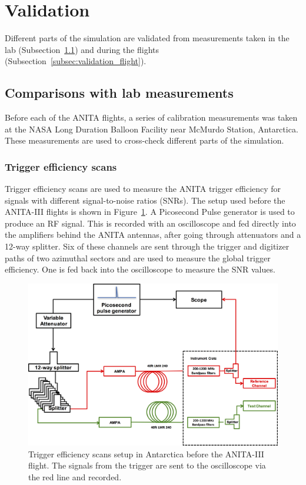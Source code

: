 \section{Validation}
\label{sec:validation}
Different parts of the simulation are validated from measurements
taken in the lab (Subsection~\ref{subsec:validation_lab}) and during
the flights (Subsection~\ref{subsec:validation_flight}).


\subsection{Comparisons with lab measurements}
\label{subsec:validation_lab}
Before each of the ANITA flights, a series of calibration measurements was
taken at the NASA Long Duration Balloon Facility near McMurdo Station, Antarctica.
These measurements are used to cross-check different parts of the simulation.

\subsubsection{Trigger efficiency scans}
\label{subsec:validation_scans}
Trigger efficiency scans are used to measure the ANITA trigger efficiency
for signals with different signal-to-noise ratios (SNRs).
The setup used before the ANITA-III flights is shown in Figure~\ref{fig:scan_setup}. 
A Picosecond Pulse generator is used to produce an RF signal. 
This is recorded with an oscilloscope and fed directly into the
amplifiers  behind the ANITA antennas, after going through attenuators and a 12-way splitter.
Six of these channels are sent through the trigger and digitizer paths of
two azimuthal sectors and
are used to measure the global trigger efficiency. 
One is fed back into the oscilloscope to measure the SNR values.

\begin{figure}[!h]\centering
  \includegraphics[width=.8\linewidth]{./Figs/TriggerEfficiencyScanSetup.png}
  \caption{Trigger efficiency scans setup in Antarctica before the ANITA-III flight. The signals from the trigger are sent to the oscilloscope via the red line and recorded.}
  \label{fig:scan_setup}
\end{figure}

